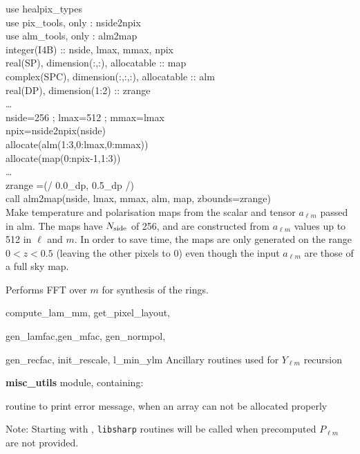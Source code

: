 \begin{example}
{
use healpix\_types \\
use pix\_tools, only : nside2npix \\
use alm\_tools, only : alm2map \\
integer(I4B) :: nside, lmax, mmax, npix \\
real(SP), dimension(:,:), allocatable :: map \\
complex(SPC), dimension(:,:,:), allocatable :: alm \\
real(DP), dimension(1:2) :: zrange \\
\ldots \\
nside=256 ; lmax=512 ; mmax=lmax\\
npix=nside2npix(nside)\\
allocate(alm(1:3,0:lmax,0:mmax))\\
allocate(map(0:npix-1,1:3))\\
\ldots \\
zrange =(/ 0.0\_dp, 0.5\_dp /) \\
call alm2map(nside, lmax, mmax, alm, map, zbounds=zrange)  \\
}
{
Make temperature and polarisation maps from the scalar and tensor $a_{\ell m}$
passed in alm. The maps have $N_\mathrm{side}$ of 256, and are constructed from
$a_{\ell m}$ values up to 512 in $\ell$ and $m$. In order to save time, 
the maps are only generated on the range $0 < z < 0.5$ (leaving the other pixels to 0) 
even though the input $a_{\ell m}$
are those of a full sky map.
}
\end{example}

\begin{modules}
  \begin{sulist}{} %
  \item[\htmlref{ring\_synthesis}{sub:ring_synthesis}] Performs FFT over $m$ for synthesis of the rings.
  \item[compute\_lam\_mm, get\_pixel\_layout, ]
  \item[gen\_lamfac,gen\_mfac, gen\_normpol, ] 
  \item[gen\_recfac, init\_rescale, l\_min\_ylm] Ancillary routines used
  for $Y_{\ell m}$ recursion
  \item[\textbf{misc\_utils}] module, containing:
  \item[\htmlref{assert\_alloc}{sub:assert}] routine to print error message, when an array can not be
  allocated properly
  \end{sulist}
Note: Starting with , {\tt libsharp} routines will be called when precomputed $P_{\ell m}$ are not provided.
\end{modules}


